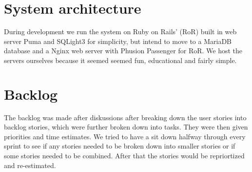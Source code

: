 \documentclass[paper=a4, fontsize=11pt]{report} %
\begin{document}
\begin{itemize}
\section*{System architecture}
	During development we run the system on Ruby on Rails' (RoR) built in web server
	Puma and SQLight3 for simplicity, but intend to move to a MariaDB database
	and a Nginx web server with Phusion Passenger for RoR. We host
	the servers ourselves because it seemed seemed fun, educational and fairly simple.

\section*{Backlog}

	The backlog was made after diskussions after breaking down the user stories
	into backlog stories, which were further broken down into tasks. They were
	then given priorities and time estimates. We tried to have a sit down halfway
	through every sprint to see if any stories needed to be broken down into
	smaller stories or if some stories needed to be combined. After that the
	stories would be repriortized and re-estimated.

	 \\



\end{itemize}
\end{document}
